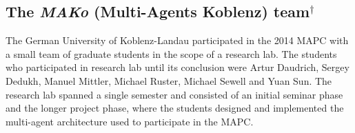\subsection{The \emph{MAKo} (Multi-Agents Koblenz) team$^\dagger$}
The German University of Koblenz-Landau participated in the 2014 MAPC with a small team of graduate students in the scope of a research lab.
The students who participated in research lab until its conclusion were Artur Daudrich, Sergey Dedukh, Manuel Mittler, Michael Ruster, Michael Sewell and Yuan Sun.
The research lab spanned a single semester and consisted of an initial seminar phase and the longer project phase, where the students designed and implemented the multi-agent architecture used to participate in the MAPC.
